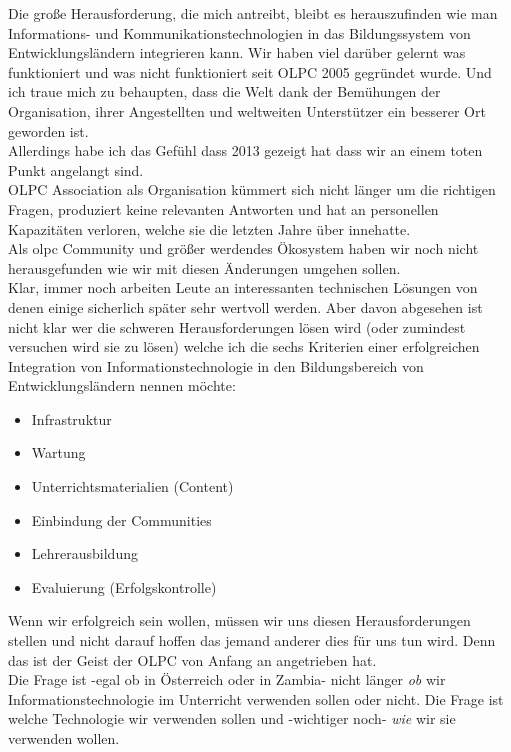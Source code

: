 \documentclass[10pt,a4paper,ngerman,twoside]{article} %
\begin{document}
Die große Herausforderung, die mich antreibt, bleibt es herauszufinden wie man Informations- und Kommunikationstechnologien in das Bildungssystem von Entwicklungsländern integrieren kann. Wir haben viel darüber gelernt was funktioniert und was nicht funktioniert seit OLPC 2005 gegründet wurde. Und ich traue mich zu behaupten, dass die Welt dank der Bemühungen der Organisation, ihrer Angestellten und weltweiten Unterstützer ein besserer Ort geworden ist. \\

Allerdings habe ich das Gefühl dass 2013 gezeigt hat dass wir an einem toten Punkt angelangt sind. \\

OLPC Association als Organisation kümmert sich nicht länger um die richtigen Fragen, produziert keine relevanten Antworten und hat an personellen Kapazitäten verloren, welche sie die letzten Jahre über innehatte. \\

Als olpc Community und größer werdendes Ökosystem haben wir noch nicht herausgefunden wie wir mit diesen Änderungen umgehen sollen. \\

Klar, immer noch arbeiten Leute an interessanten technischen Lösungen von denen einige sicherlich später sehr wertvoll werden. Aber davon abgesehen ist nicht klar wer die schweren Herausforderungen lösen wird (oder zumindest versuchen wird sie zu lösen) welche ich die sechs Kriterien einer erfolgreichen Integration von Informationstechnologie in den Bildungsbereich von Entwicklungsländern nennen möchte:

\begin{itemize}
\item Infrastruktur
\item Wartung
\item Unterrichtsmaterialien (Content)
\item Einbindung der Communities
\item Lehrerausbildung
\item Evaluierung (Erfolgskontrolle)
\end{itemize}

Wenn wir erfolgreich sein wollen, müssen wir uns diesen Herausforderungen stellen und nicht darauf hoffen das jemand anderer dies für uns tun wird. Denn das ist der Geist der OLPC von Anfang an angetrieben hat. \\

Die Frage ist -egal ob in Österreich oder in Zambia- nicht länger \textit{ob} wir Informationstechnologie im Unterricht verwenden sollen oder nicht. Die Frage ist welche Technologie wir verwenden sollen und -wichtiger noch- \textit{wie} wir sie verwenden wollen. \\
\end{document}
